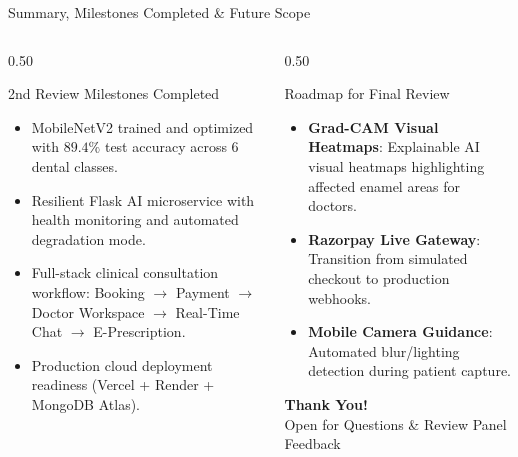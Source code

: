 \documentclass[aspectratio=169, 10pt]{beamer}
\begin{document}
\begin{frame}{Summary, Milestones Completed \& Future Scope}
\begin{columns}[T]
    \begin{column}{0.50\textwidth}
        \begin{block}{2nd Review Milestones Completed}
            \footnotesize
            \begin{itemize}
                \item[$\checkmark$] MobileNetV2 trained and optimized with $89.4\%$ test accuracy across 6 dental classes.
                \item[$\checkmark$] Resilient Flask AI microservice with health monitoring and automated degradation mode.
                \item[$\checkmark$] Full-stack clinical consultation workflow: Booking $\to$ Payment $\to$ Doctor Workspace $\to$ Real-Time Chat $\to$ E-Prescription.
                \item[$\checkmark$] Production cloud deployment readiness (Vercel + Render + MongoDB Atlas).
            \end{itemize}
        \end{block}
    \end{column}
    \begin{column}{0.50\textwidth}
        \begin{exampleblock}{Roadmap for Final Review}
            \footnotesize
            \begin{itemize}
                \item \textbf{Grad-CAM Visual Heatmaps}: Explainable AI visual heatmaps highlighting affected enamel areas for doctors.
                \item \textbf{Razorpay Live Gateway}: Transition from simulated checkout to production webhooks.
                \item \textbf{Mobile Camera Guidance}: Automated blur/lighting detection during patient capture.
            \end{itemize}
        \end{exampleblock}
        \vspace{0.3cm}
        \centering
        \textbf{\large Thank You!}\\[1ex]
        \small Open for Questions \& Review Panel Feedback
    \end{column}
\end{columns}
\end{frame}
\end{document}

